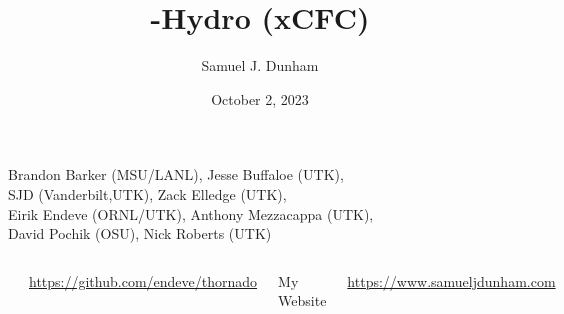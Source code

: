 \documentclass{beamer}
\title[SXS NR Community Call]{\thornado-Hydro (xCFC)}
\author{Samuel J. Dunham}
\date{October 2, 2023}
\begin{document}
\begin{frame}

  \maketitle

  \vspace{-1em}

  \begin{center}
    Brandon Barker (MSU/LANL), %
    Jesse Buffaloe (UTK), \\
    SJD (Vanderbilt,UTK), %
    Zack Elledge (UTK), \\
    Eirik Endeve (ORNL/UTK), %
    Anthony Mezzacappa (UTK), \\
    David Pochik (OSU), %
    Nick Roberts (UTK)
  \end{center}

  \vspace{-1em}

  \begin{columns}[c]

      \begin{center}\thornado\end{center}
      \vspace{-1.0em}
      \url{https://github.com/endeve/thornado}

      \begin{center}My Website\end{center}
      \vspace{-1.0em}
      \url{https://www.samueljdunham.com}

  \end{columns}

\end{frame}
\end{document}
